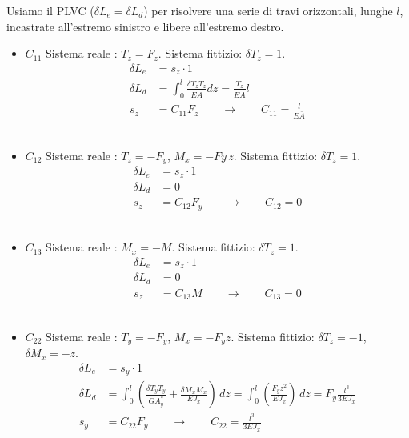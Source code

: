 Usiamo il PLVC ($\delta L_e =  \delta L_d $) per risolvere una serie di travi orizzontali, lunghe $l$, incastrate all'estremo sinistro e libere all'estremo destro.
\begin{itemize}
    \item $C_{11}$
    Sistema reale : $T_z = F_z $. Sistema fittizio: $\delta T_z = 1$. 
    \begin{align*}
        \delta L_e &= s_z \cdot 1 \\
        \delta L_d &= \int_0^l \frac{\delta T_z T_z}{E\bar{A}} dz = \frac{T_z}{E\bar{A}}l\\
        s_z &= C_{11} F_z\quad \quad\rightarrow\quad\quad C_{11} =\frac{l}{E\bar{A}}
    \end{align*}\\

    \item $C_{12}$
    Sistema reale : $T_z = -F_y $, $M_x=-Fy\,z$. Sistema fittizio: $\delta T_z = 1$. 
    \begin{align*}
        \delta L_e &= s_z \cdot 1 \\
        \delta L_d &= 0\\
        s_z &= C_{12} F_y\quad \quad\rightarrow\quad\quad C_{12} =0
    \end{align*}\\

    \item $C_{13}$
    Sistema reale : $M_x=-M$. Sistema fittizio: $\delta T_z = 1$. 
    \begin{align*}
        \delta L_e &= s_z \cdot 1 \\
        \delta L_d &= 0\\
        s_z &= C_{13} M\quad \quad\rightarrow\quad\quad C_{13} =0
    \end{align*}\\

    \item $C_{22}$
    Sistema reale : $T_y = -F_y $, $M_x =-F_yz$. Sistema fittizio: $\delta T_z = -1$, $\delta M_x = -z$. 
    \begin{align*}
        \delta L_e &= s_y \cdot 1 \\
        \delta L_d &= \int_0^l \left(  \frac{\delta T_y T_y}{GA^*_y} +  \frac{\delta M_xM_x}{EJ_x}\right)\,dz 
        =\int_0^l \left(    \frac{F_yz^2}{EJ_x}  \right)\,dz 
        = F_y\frac{l^3}{3EJ_x}\\
        s_y &= C_{22} F_y\quad \quad\rightarrow\quad\quad C_{22} =\frac{l^3}{3EJ_x}
    \end{align*}\\


\end{itemize}
